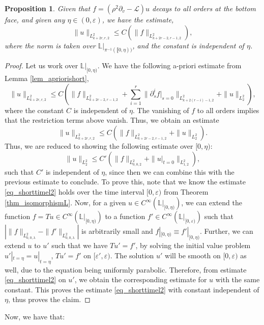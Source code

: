 \documentclass[10pt, a4paper]{article}
\theoremstyle{plain}%
\newtheorem{prop}[theorem]{Proposition}
\theoremstyle{definition}
\numberwithin{figure}{section}
\numberwithin{equation}{section}
\newcommand{\bL}{\mathbb{L}}
\newcommand{\pa}{\partial}
\newcommand{\ep}{\varepsilon}
\newcommand{\cL}{\mathcal{L}}
\begin{document}
\begin{prop}
 
	Given that $f=(\rho^2\pa_v-\cL) u$ decays to all orders at the bottom face, and given any $\eta \in (0,\ep)$, we have the estimate, \[
	\|u\|_{L^2_{k+2r,r,2}} \leq C(\|f\|_{L^2_{k+2r-2,r-1,2}}),
	\]
	where the norm is taken over $\bL|_{\pi^{-1}(\llbracket0,\eta))}$, and the constant is independent of $\eta$. 
\end{prop}
\begin{proof}
	Let us work over $\bL|_{[0,\eta)}$. We have the following a-priori estimate from Lemma \ref{lem_apriorishort}, \[
	\|u\|_{L^2_{k+2r,r,2}}\leq C\left(\|f\|_{L^2_{k+2r-2,r-1,2}}+\sum_{i=1}^{r} \|\pa^i_sf|_{s=0}\|_{L^2_{k+2(r-i)-1,2}}+\|u\|_{L^2_2}\right),
	\] 
	where the constant $C$ is independent of $\eta$. The vanishing of $f$ to all orders implies that the restriction terms above vanish. Thus, we obtain an estimate \[
		\|u\|_{L^2_{k+2r,r,2}}\leq C\left(\|f\|_{L^2_{k+2r-2,r-1,2}}+\|u\|_{L^2_2}\right).
	\] Thus, we are reduced to showing the following estimate over $[0,\eta)$: \begin{equation}\label{eq_shorttimel2}
		\|u\|_{L^2_2} \leq C'(\|f\|_{L^2_{0,0,2}}+\|u|_{t=0}\|_{L^2_{1,2}}),
	\end{equation}
	such that $C'$ is independent of $\eta$, since then we can combine this with the previous estimate to conclude. To prove this, note that we know the estimate \eqref{eq_shorttimel2} holds over the time interval $[0,\ep)$ from Theorem \ref{thm_isomorphismL}. Now, for a given $u\in C^\infty(\bL|_{[0,\eta)})$, we can extend the function $f=Tu \in C^\infty(\bL|_{[0,\eta)})$ to a function $f'\in C^\infty(\bL|_{[0,\ep)})$ such that $|\|f\|_{L^2_{0,0,\lambda}}- \|f'\|_{L^2_{0,0,\lambda}}|$ is arbitrarily small and $f|_{[0,\eta)} \equiv f'|_{[0,\eta)}$. Further, we can extend $u$ to $u'$ such that we have $Tu'=f'$, by solving the initial value problem $u'|_{t=\eta}=u|_{t=\eta}$, $Tu'=f'$ on $[\ep',\ep)$. The solution $u'$ will be smooth on $[0,\ep)$ as well, due to the equation being uniformly parabolic. Therefore, from estimate \eqref{eq_shorttimel2} on $u'$, we obtain the corresponding estimate for $u$ with the same constant. This proves the estimate \eqref{eq_shorttimel2} with constant independent of $\eta$, thus proves the claim. 
\end{proof}

Now, we have that:
\end{document}

